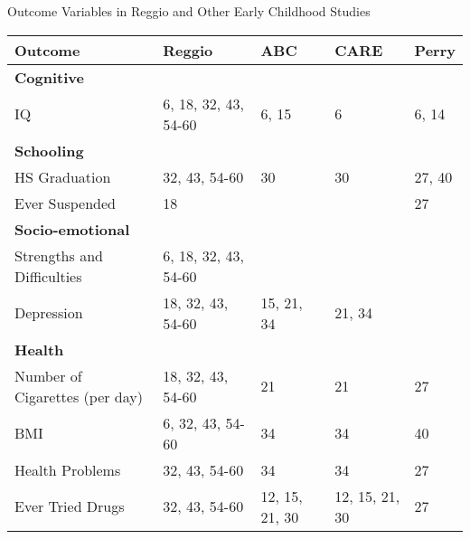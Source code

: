\caption{Outcome Variables in Reggio and Other Early Childhood Studies}
\begin{tabular}{lllll}
\toprule
Outcome & Reggio & ABC & CARE & Perry \\
\midrule
\textbf{Cognitive} & & & & \\
\quad IQ & 6, 18, 32, 43, 54-60 & 6, 15 & 6 & 6, 14 \\
\textbf{Schooling} & & & & \\
\quad HS Graduation & 32, 43, 54-60 & 30 & 30 & 27, 40 \\
\quad Ever Suspended & 18 & & & 27 \\
\textbf{Socio-emotional} & & & & \\
\quad Strengths and Difficulties & 6, 18, 32, 43, 54-60 & & & \\
\quad Depression &18, 32, 43, 54-60 & 15, 21, 34 & 21, 34 & \\
\textbf{Health} & & & & \\
\quad Number of Cigarettes (per day) & 18, 32, 43, 54-60 & 21 & 21 & 27 \\
\quad BMI & 6, 32, 43, 54-60 & 34 & 34 & 40 \\
\quad Health Problems & 32, 43, 54-60 & 34 & 34 & 27 \\
\quad Ever Tried Drugs & 32, 43, 54-60 & 12, 15, 21, 30 & 12, 15, 21, 30 & 27 \\
\bottomrule
\end{tabular}
%
%